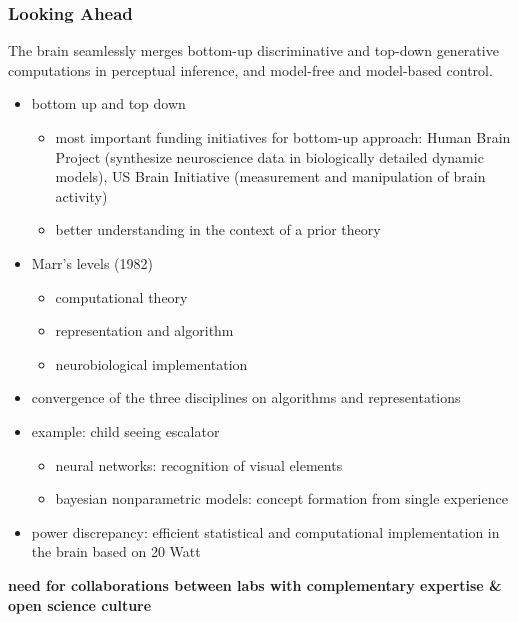 \documentclass[
t, %
10pt, %
aspectratio=1610, %
ngerman,
english,
]{beamer}
\begin{document}
\begin{frame}
    \frametitle{Looking Ahead}
    The brain seamlessly merges bottom-up discriminative and top-down generative computations in perceptual inference, and model-free and model-based control.
    \begin{itemize}
     \item bottom up and top down
     \begin{itemize}
      \item most important funding initiatives for bottom-up approach: Human Brain Project (synthesize neuroscience data in biologically detailed dynamic models), US Brain Initiative (measurement and manipulation of brain activity)
      \item better understanding in the context of a prior theory
     \end{itemize}
    \item Marr's levels (1982)
    \begin{itemize}
     \item computational theory
     \item representation and algorithm
     \item neurobiological implementation
    \end{itemize}
    \item \textrightarrow convergence of the three disciplines on algorithms and representations
    \item example: child seeing escalator
    \begin{itemize}
     \item neural networks: recognition of visual elements
     \item bayesian nonparametric models: concept formation from single experience
    \end{itemize}
    \item power discrepancy: efficient statistical and computational implementation in the brain based on 20 Watt
    \end{itemize}
    \textbf{\textrightarrow need for collaborations between labs with complementary expertise \& open science culture}
\end{frame}
\end{document}
